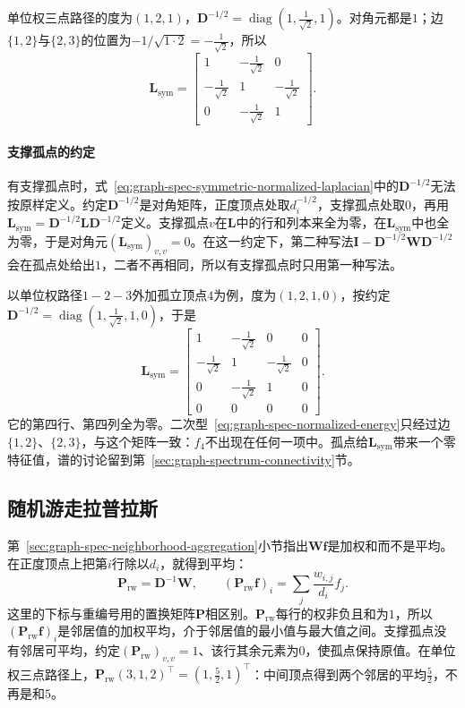 单位权三点路径的度为$(1,2,1)$，$\bm D^{-1/2}=\operatorname{diag}(1,\tfrac1{\sqrt2},1)$。对角元都是$1$；边$\{1,2\}$与$\{2,3\}$的位置为$-1/\sqrt{1\cdot2}=-\tfrac1{\sqrt2}$，所以
\[
 \bm L_{\mathrm{sym}}=\begin{bmatrix}1&-\tfrac1{\sqrt2}&0\\-\tfrac1{\sqrt2}&1&-\tfrac1{\sqrt2}\\0&-\tfrac1{\sqrt2}&1\end{bmatrix}.
\]

\paragraph{支撑孤点的约定}
有支撑孤点时，式~\eqref{eq:graph-spec-symmetric-normalized-laplacian}中的$\bm D^{-1/2}$无法按原样定义。约定$\bm D^{-1/2}$是对角矩阵，正度顶点处取$d_i^{-1/2}$，支撑孤点处取$0$，再用$\bm L_{\mathrm{sym}}=\bm D^{-1/2}\bm L\bm D^{-1/2}$定义。支撑孤点$v$在$\bm L$中的行和列本来全为零，在$\bm L_{\mathrm{sym}}$中也全为零，于是对角元$(\bm L_{\mathrm{sym}})_{v,v}=0$。在这一约定下，第二种写法$\bm I-\bm D^{-1/2}\bm W\bm D^{-1/2}$会在孤点处给出$1$，二者不再相同，所以有支撑孤点时只用第一种写法。

以单位权路径$1-2-3$外加孤立顶点$4$为例，度为$(1,2,1,0)$，按约定$\bm D^{-1/2}=\operatorname{diag}(1,\tfrac1{\sqrt2},1,0)$，于是
\[
 \bm L_{\mathrm{sym}}=\begin{bmatrix}1&-\tfrac1{\sqrt2}&0&0\\-\tfrac1{\sqrt2}&1&-\tfrac1{\sqrt2}&0\\0&-\tfrac1{\sqrt2}&1&0\\0&0&0&0\end{bmatrix}.
\]
它的第四行、第四列全为零。二次型~\eqref{eq:graph-spec-normalized-energy}只经过边$\{1,2\}$、$\{2,3\}$，与这个矩阵一致：$f_4$不出现在任何一项中。孤点给$\bm L_{\mathrm{sym}}$带来一个零特征值，谱的讨论留到第~\ref{sec:graph-spectrum-connectivity}节。

\subsection{随机游走拉普拉斯}
\label{sec:graph-spec-random-walk-laplacian}

第~\ref{sec:graph-spec-neighborhood-aggregation}小节指出$\bm W\bm f$是加权和而不是平均。在正度顶点上把第$i$行除以$d_i$，就得到平均：
\[
 \bm P_{\mathrm{rw}}=\bm D^{-1}\bm W,\qquad
 (\bm P_{\mathrm{rw}}\bm f)_i=\sum_j\frac{w_{i,j}}{d_i}f_j .
\]
这里的下标与重编号用的置换矩阵$\bm P$相区别。$\bm P_{\mathrm{rw}}$每行的权非负且和为$1$，所以$(\bm P_{\mathrm{rw}}\bm f)_i$是邻居值的加权平均，介于邻居值的最小值与最大值之间。支撑孤点没有邻居可平均，约定$(\bm P_{\mathrm{rw}})_{v,v}=1$、该行其余元素为$0$，使孤点保持原值。在单位权三点路径上，$\bm P_{\mathrm{rw}}(3,1,2)^{\top}=(1,\tfrac52,1)^{\top}$：中间顶点得到两个邻居的平均$\tfrac52$，不再是和$5$。

